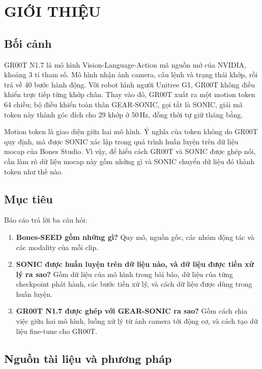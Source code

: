 \documentclass[12pt,a4paper,oneside]{report}
\begin{document}
\chapter*{GIỚI THIỆU}

\section*{Bối cảnh}

GR00T N1.7 là mô hình Vision-Language-Action mã nguồn mở của NVIDIA, khoảng 3 tỉ tham số. Mô hình nhận ảnh camera, câu lệnh và trạng thái khớp, rồi trả về 40 bước hành động. Với robot hình người Unitree G1, GR00T không điều khiển trực tiếp từng khớp chân. Thay vào đó, GR00T xuất ra một motion token 64 chiều; bộ điều khiển toàn thân GEAR-SONIC, gọi tắt là SONIC, giải mã token này thành góc đích cho 29 khớp ở 50\,Hz, đồng thời tự giữ thăng bằng.

Motion token là giao diện giữa hai mô hình. Ý nghĩa của token không do GR00T quy định, mà được SONIC xác lập trong quá trình huấn luyện trên dữ liệu mocap của Bones Studio. Vì vậy, để hiểu cách GR00T và SONIC được ghép nối, cần làm rõ dữ liệu mocap này gồm những gì và SONIC chuyển dữ liệu đó thành token như thế nào.

\section*{Mục tiêu}

Báo cáo trả lời ba câu hỏi:
\begin{enumerate}
\item \textbf{Bones-SEED gồm những gì?} Quy mô, nguồn gốc, các nhóm động tác và các modality của mỗi clip.
\item \textbf{SONIC được huấn luyện trên dữ liệu nào, và dữ liệu được tiền xử lý ra sao?} Gồm dữ liệu của mô hình trong bài báo, dữ liệu của từng checkpoint phát hành, các bước tiền xử lý, và cách dữ liệu được dùng trong huấn luyện.
\item \textbf{GR00T N1.7 được ghép với GEAR-SONIC ra sao?} Gồm cách chia việc giữa hai mô hình, luồng xử lý từ ảnh camera tới động cơ, và cách tạo dữ liệu fine-tune cho GR00T.
\end{enumerate}

\section*{Nguồn tài liệu và phương pháp}
\end{document}
